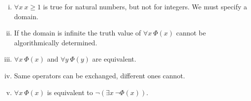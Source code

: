 \documentclass[../../script.tex]{subfiles}
\begin{document}
\begin{rem}\leavevmode
\begin{enumerate}[(i)]
	\item $\forall x ~x \ge 1$ is true for natural numbers, but not for integers. We must specify a domain.
	\item If the domain is infinite the truth value of $\forall x ~\Phi(x)$ cannot be algorithmically determined.
	\item $\forall x ~\Phi(x)$ and $\forall y ~\Phi(y)$ are equivalent.
	\item Same operators can be exchanged, different ones cannot.
	\item $\forall x ~\Phi(x)$ is equivalent to $\neg(\exists x ~\neg\Phi(x))$.
\end{enumerate}
\end{rem}
\end{document}
